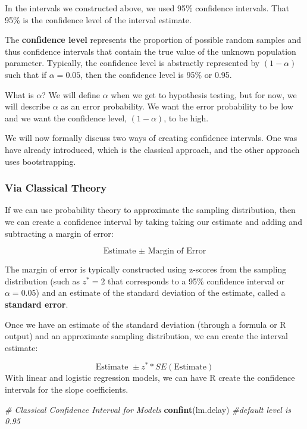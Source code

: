\documentclass[
]{book}
\newenvironment{Shaded}{\begin{snugshade}}{\end{snugshade}}
\newcommand{\CommentTok}[1]{\textcolor[rgb]{0.56,0.35,0.01}{\textit{#1}}}
\newcommand{\KeywordTok}[1]{\textcolor[rgb]{0.13,0.29,0.53}{\textbf{#1}}}
\newcommand{\NormalTok}[1]{#1}
\begin{document}
In the intervals we constructed above, we used 95\% confidence intervals. That 95\% is the confidence level of the interval estimate.

The \textbf{confidence level} represents the proportion of possible random samples and thus confidence intervals that contain the true value of the unknown population parameter. Typically, the confidence level is abstractly represented by \((1-\alpha)\) such that if \(\alpha = 0.05\), then the confidence level is 95\% or 0.95.

What is \(\alpha\)? We will define \(\alpha\) when we get to hypothesis testing, but for now, we will describe \(\alpha\) as an error probability. We want the error probability to be low and we want the confidence level, \((1-\alpha)\), to be high.

We will now formally discuss two ways of creating confidence intervals. One was have already introduced, which is the classical approach, and the other approach uses bootstrapping.

\hypertarget{via-classical-theory}{%
\subsubsection{Via Classical Theory}\label{via-classical-theory}}

If we can use probability theory to approximate the sampling distribution, then we can create a confidence interval by taking taking our estimate and adding and subtracting a margin of error:

\[\text{Estimate }\pm \text{ Margin of Error}\]

The margin of error is typically constructed using z-scores from the sampling distribution (such as \(z^* = 2\) that corresponds to a 95\% confidence interval or \(\alpha = 0.05\)) and an estimate of the standard deviation of the estimate, called a \textbf{standard error}.

Once we have an estimate of the standard deviation (through a formula or R output) and an approximate sampling distribution, we can create the interval estimate:

\[\text{Estimate }\pm z^* *SE(\text{Estimate})\]
With linear and logistic regression models, we can have R create the confidence intervals for the slope coefficients.

\begin{Shaded}
\begin{Highlighting}[]
\CommentTok{# Classical Confidence Interval for Models}
\KeywordTok{confint}\NormalTok{(lm.delay) }\CommentTok{#default level is 0.95}
\end{Highlighting}
\end{Shaded}
\end{document}
